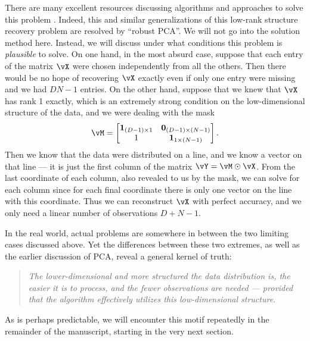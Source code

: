 \documentclass[\toplevelprefix/book-main.tex]{subfiles}
\begin{document}
There are many excellent resources discussing algorithms and approaches to solve this problem \cite{Wright-Ma-2022}. Indeed, this and similar generalizations of this low-rank structure recovery problem are resolved by ``robust PCA''. We will not go into the solution method here. Instead, we will discuss under what conditions this problem is \textit{plausible} to solve. On one hand, in the most absurd case, suppose that each entry of the matrix \(\vX\) were chosen independently from all the others. Then there would be no hope of recovering \(\vX\) exactly even if only one entry were missing and we had \(DN - 1\) entries. On the other hand, suppose that we knew that \(\vX\) has rank 1 exactly, which is an extremely strong condition on the low-dimensional structure of the data, and we were dealing with the mask
\begin{equation}
    \vM = \mat{\vone_{(D - 1) \times 1} & \vzero_{(D - 1) \times (N - 1)} \\ 1 & \vone_{1 \times (N - 1)} }.
\end{equation}
Then we know that the data were distributed on a line, and we know a vector on that line --- it is just the first column of the matrix \(\vY = \vM \odot \vX\). From the last coordinate of each column, also revealed to us by the mask, we can solve for each column since for each final coordinate there is only one vector on the line with this coordinate. Thus we can reconstruct \(\vX\) with perfect accuracy, and we only need a linear number of observations \(D + N - 1\). 

In the real world, actual problems are somewhere in between the two limiting cases discussed above. Yet the differences between these two extremes, as well as the earlier discussion of PCA, reveal a general kernel of truth:
\begin{quote}
    \centering
    \textit{The lower-dimensional and more structured the data distribution is, the easier it is to process, and the fewer observations are needed --- provided that the algorithm effectively utilizes this low-dimensional structure.}
\end{quote}
As is perhaps predictable, we will encounter this motif repeatedly in the remainder of the manuscript, starting in the very next section.
\end{document}
